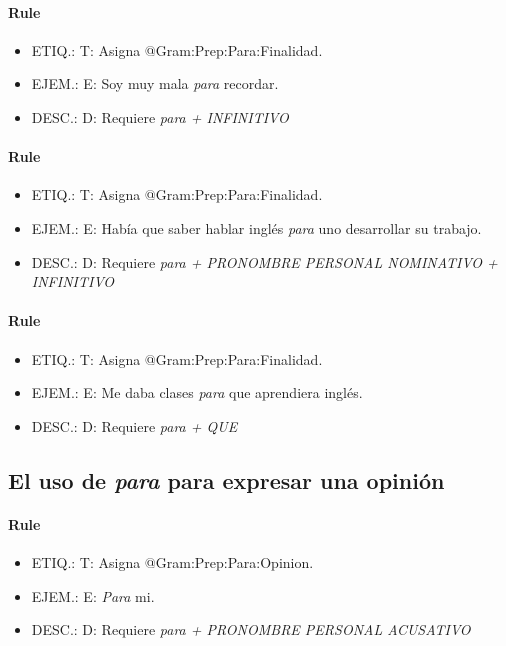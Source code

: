 \documentclass[11pt]{report}
\begin{document}
\paragraph*{Rule}
\begin{itemize}
\item ETIQ.:  T: Asigna @Gram:Prep:Para:Finalidad.
\item EJEM.:  E: Soy muy mala \emph{para} recordar.
\item DESC.:  D: Requiere \emph{para + INFINITIVO}
\end{itemize}

\paragraph*{Rule}
\begin{itemize}
\item ETIQ.:  T: Asigna @Gram:Prep:Para:Finalidad.
\item EJEM.:  E: Había que saber hablar inglés \emph{para} uno desarrollar su trabajo.
\item DESC.:  D: Requiere \emph{para + PRONOMBRE PERSONAL NOMINATIVO + INFINITIVO}
\end{itemize}

\paragraph*{Rule}
\begin{itemize}
\item ETIQ.:  T: Asigna @Gram:Prep:Para:Finalidad.
\item EJEM.:  E: Me daba clases \emph{para} que aprendiera inglés.
\item DESC.:  D: Requiere \emph{para + QUE}
\end{itemize}

\subsection{El uso de \emph{para} para expresar una opinión}
\paragraph*{Rule}
\begin{itemize}
\item ETIQ.:  T: Asigna @Gram:Prep:Para:Opinion.
\item EJEM.:  E: \emph{Para} mi.
\item DESC.:  D: Requiere \emph{para + PRONOMBRE PERSONAL ACUSATIVO}
\end{itemize}
\end{document}
